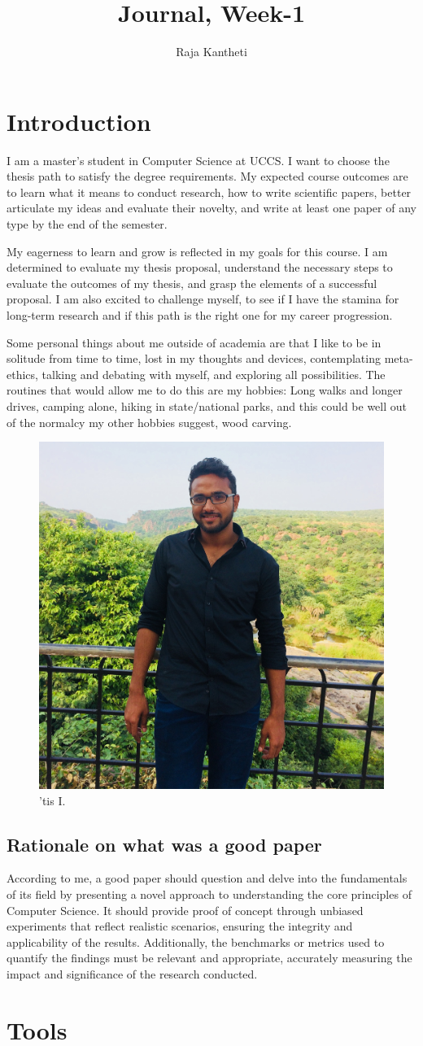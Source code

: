 \documentclass{article}
\title{Journal, Week-1}
\author{Raja Kantheti}
\begin{document}
\maketitle


\section{Introduction}
I am a master's student in Computer Science at UCCS. I want to choose the thesis path to satisfy the degree requirements. My expected course outcomes are to learn what it means to conduct research, how to write scientific papers, better articulate my ideas and evaluate their novelty, and write at least one paper of any type by the end of the semester.

My eagerness to learn and grow is reflected in my goals for this course. I am determined to evaluate my thesis proposal, understand the necessary steps to evaluate the outcomes of my thesis, and grasp the elements of a successful proposal. I am also excited to challenge myself, to see if I have the stamina for long-term research and if this path is the right one for my career progression.

Some personal things about me outside of academia are that I like to be in solitude from time to time, lost in my thoughts and devices, contemplating meta-ethics, talking and debating with myself, and exploring all possibilities. The routines that would allow me to do this are my hobbies: Long walks and longer drives, camping alone, hiking in state/national parks, and this could be well out of the normalcy my other hobbies suggest, wood carving. 
\begin{figure}[h]
\centering
\includegraphics[width=0.25\linewidth]{IMG_1667.JPG}
\caption{'tis I. }
\end{figure}

\subsection[short]{Rationale on what was a good paper}
According to me, a good paper should question and delve into the fundamentals of its field by presenting a novel approach to understanding the core principles of Computer Science. It should provide proof of concept through unbiased experiments that reflect realistic scenarios, ensuring the integrity and applicability of the results. Additionally, the benchmarks or metrics used to quantify the findings must be relevant and appropriate, accurately measuring the impact and significance of the research conducted. 
\section{Tools}
\subsection[short]{}
\end{document}
